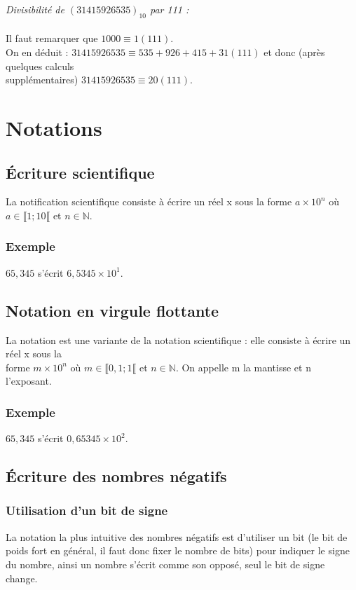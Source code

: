 \documentclass[a4paper,10pt]{book}
\newcommand{\N}{\mathbb{N}}
\begin{document}
\emph{Divisibilité de $(31415926535)_{10}$ par 111 :}\\\\
Il faut remarquer que $1000\equiv 1(111)$.\\

On en déduit : $31415926535\equiv 535+926+415+31(111)$ et donc (après quelques calculs\\
supplémentaires) $31415926535 \equiv 20(111)$.

\section{Notations}
\subsection{Écriture scientifique}
La notification scientifique consiste à écrire un réel x sous la forme $a\times 10^{n}$ où\\
$a\in \llbracket 1;10 \llbracket$ et $n\in \N$.

\subsubsection{Exemple}
$65,345$ s'écrit $6,5345\times 10^{1}$.

\subsection{Notation en virgule flottante} \label{flottant}
La notation est une variante de la notation scientifique : elle consiste à écrire un réel x sous la\\
forme $m\times 10^{n}$ où $m\in \llbracket 0,1;1 \llbracket$ et $n\in \N$.
On appelle m la mantisse et n l'exposant.

\subsubsection{Exemple}
$65,345$ s'écrit $0,65345\times 10^{2}$.

\subsection{Écriture des nombres négatifs}
\subsubsection{Utilisation d'un bit de signe}
La notation la plus intuitive des nombres négatifs est d'utiliser un bit (le bit de poids fort en général, il faut donc fixer le nombre de bits) pour indiquer le signe du nombre, ainsi un nombre s'écrit comme son opposé, seul le bit de signe change.
\end{document}
